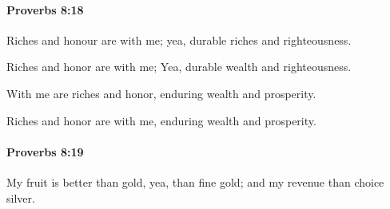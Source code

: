 		\paragraph{Proverbs 8:18} %
			\label{PROVERBS-8-18}

			Riches and honour are with me; yea, durable riches and righteousness.

			\begin{versebox}
					\item[BHS] 
					\item[ASV] Riches and honor are with me; Yea, durable wealth and righteousness.
					\item[NIV] With me are riches and honor, enduring wealth and prosperity.
					\item[NRSV] Riches and honor are with me, enduring wealth and prosperity.
			\end{versebox}

		\paragraph{Proverbs 8:19} %
			\label{PROVERBS-8-19}

			My fruit is better than gold, yea, than fine gold; and my revenue than choice silver.

